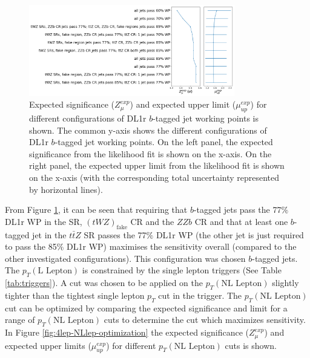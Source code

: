 \begin{figure}[h!]
	\includegraphics[width = 0.8\textwidth]{figures/btagWP_optimization.png}
  \centering
	\caption{Expected significance ($Z_{\mu}^{exp}$) and expected upper limit ($\mu_{up}^{exp}$) for different configurations of DL1r $b$-tagged jet working points is shown. The common y-axis shows the different configurations of DL1r $b$-tagged jet working points. On the left panel, the expected significance from the likelihood fit is shown on the x-axis. On the right panel, the expected upper limit from the likelihood fit is shown on the x-axis (with the corresponding total uncertainty represented by horizontal lines).}
	\label{fig:4lep-btagWP-optimization}
\end{figure}From Figure \ref{fig:4lep-btagWP-optimization}, it can be seen that requiring that $b$-tagged jets pass the 77$\%$ DL1r WP in the \tWZ SR, $(tWZ)_{\text{fake}}$ CR and the $ZZb$ CR and that at least one $b$-tagged jet in the $t\bar{t}Z$ SR passes the 77$\%$ DL1r WP (the other jet is just required to pass the 85$\%$ DL1r WP) maximises the sensitivity overall (compared to the other investigated configurations). This configuration was chosen $b$-tagged jets. The $p_{T}(\text{L Lepton})$ is constrained by the single lepton triggers (See Table \ref{tab:triggers}). A cut was chosen to be applied on the $p_{T}(\text{NL Lepton})$ slightly tighter than the tightest single lepton $p_{T}$ cut in the trigger. The $p_{T}(\text{NL Lepton})$ cut can be optimized by comparing the expected significance and limit for a range of $p_{T}{(\text{NL Lepton})}$ cuts to determine the cut which maximizes sensitivity. In Figure \ref{fig:4lep-NLlep-optimization} the expected significance ($Z_{\mu}^{exp}$) and expected upper limits ($\mu_{up}^{exp}$) for different $p_{T}(\text{NL Lepton})$ cuts is shown.
